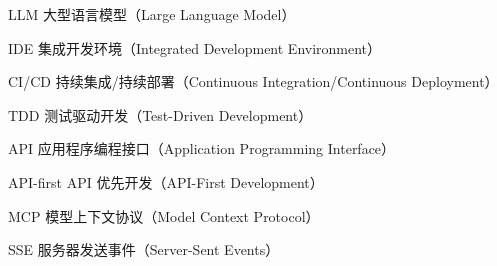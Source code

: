 
\begin{denotation}[3cm]
  \item[LLM] 大型语言模型（Large Language Model）
  \item[IDE] 集成开发环境（Integrated Development Environment）
  \item[CI/CD] 持续集成/持续部署（Continuous Integration/Continuous Deployment）
  \item[TDD] 测试驱动开发（Test-Driven Development）
  \item[API] 应用程序编程接口（Application Programming Interface）
  \item[API-first] API 优先开发（API-First Development）
  \item[MCP] 模型上下文协议（Model Context Protocol）
  \item[SSE] 服务器发送事件（Server-Sent Events）
\end{denotation}





